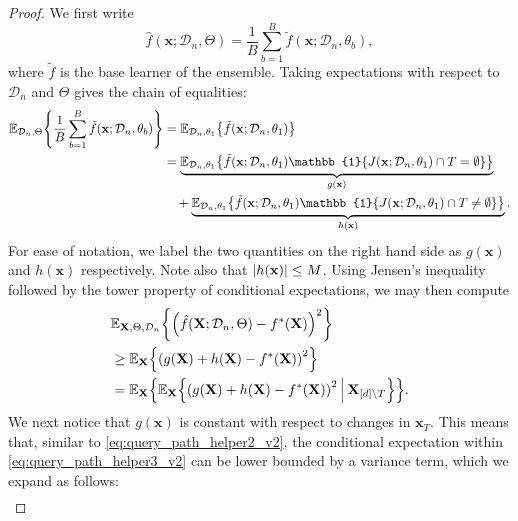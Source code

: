 \documentclass[11pt]{article}
\newcommand{\bx}{\mathbf{x}}
\newcommand{\bX}{\mathbf{X}}
\DeclarePairedDelimiter{\braces}{\lbrace}{\rbrace}
\DeclarePairedDelimiter{\paren}{(}{)}
\DeclarePairedDelimiter{\abs}{|}{|}
\newcommand{\E}{\mathbb{E}}
\newcommand{\indicator}{\mathbb{1}}
\newcommand{\nfeats}{d}
\newcommand{\coordindices}{[\nfeats]}
\newcommand{\data}[1][n]{\mathcal{D}_{#1}}
\newcommand{\traversal}{T}
\begin{document}
\begin{proof}
    We first write
    \begin{equation}
        \hat f(\bx;\data,\Theta) = \frac{1}{B}\sum_{b=1}^B \tilde f(\bx;\data,\theta_b),
    \end{equation}
    where $\tilde f$ is the base learner of the ensemble.
    Taking expectations with respect to $\data$ and $\Theta$ gives the chain of equalities:
    \begin{equation}
        \begin{split}
            \E_{\data,\Theta}\braces*{\frac{1}{B}\sum_{b=1}^B \tilde f(\bx;\data,\theta_b)}
            & = \E_{\data,\theta_1}\braces*{\tilde f(\bx;\data,\theta_1)} \\
            & = \underbrace{\E_{\data,\theta_1}\braces*{\tilde f(\bx;\data,\theta_1)\indicator\braces*{J(\bx;\data,\theta_1)\cap \traversal = \emptyset }}}_{g(\bx)} \\
            & \quad + \underbrace{\E_{\data,\theta_1}\braces*{\tilde f(\bx;\data,\theta_1)\indicator\braces*{J(\bx;\data,\theta_1)\cap \traversal \neq \emptyset }}}_{h(\bx)}.
        \end{split}
    \end{equation}
    For ease of notation, we label the two quantities on the right hand side as $g(\bx)$ and $h(\bx)$ respectively.
    Note also that $\abs*{h(\bx)} \leq M$.
    Using Jensen's inequality followed by the tower property of conditional expectations, we may then compute 
    \begin{equation}
    \label{eq:query_path_helper3_v2}
    \begin{split}
        & \E_{\bX,\Theta,\data}\braces*{\paren*{\hat f(\bX;\data,\Theta) - f^*(\bX)}^2} \\
        & \geq \E_\bX\braces*{\paren*{g(\bX) + h(\bX) - f^*(\bX)}^2} \\
        & = \E_\bX\braces*{\E_{\bX}\braces*{\paren*{g(\bX) + h(\bX) - f^*(\bX)}^2~\vline~ \bX_{\coordindices\backslash\traversal}}}.
    \end{split}
    \end{equation}
    We next notice that $g(\bx)$ is constant with respect to changes in $\bx_{\traversal}$.
    This means that, similar to \eqref{eq:query_path_helper2_v2}, the conditional expectation within \eqref{eq:query_path_helper3_v2} can be lower bounded by a variance term, which we expand as follows:
    \begin{equation}
    \label{eq:query_path_helper4_v2}
        \begin{split}

\end{split}
\end{equation}
\end{proof}
\end{document}
